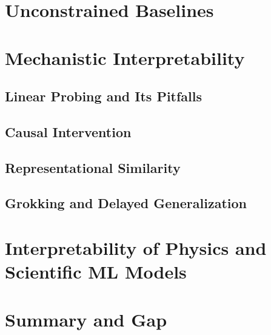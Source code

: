 \section{Unconstrained Baselines}
\section{Mechanistic Interpretability}
\subsection{Linear Probing and Its Pitfalls}
\subsection{Causal Intervention}
\subsection{Representational Similarity}
\subsection{Grokking and Delayed Generalization}
\section{Interpretability of Physics and Scientific ML Models}
\section{Summary and Gap}
